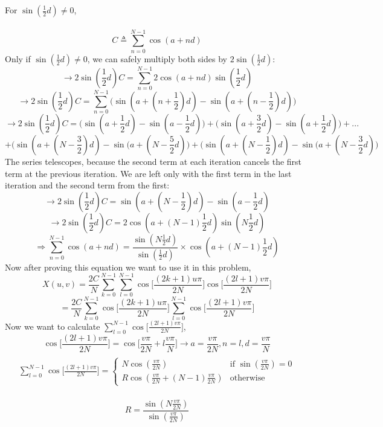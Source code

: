 \documentclass[fleqn]{article}
\begin{document}
\begin{question}
{For $\sin(\frac{1}{2}d) \neq 0$,\\~\\
\[C \triangleq \sum_{n=0}^{N-1}\cos(a + nd)\]
Only if $\sin(\frac{1}{2}d) \neq 0$, we can safely multiply both sides by $2\sin(\frac{1}{2}d)$:
\[\rightarrow  2 \sin(\frac{1}{2} d) C = \sum_{n=0}^{N-1}2 \cos(a + nd) \sin(\frac{1}{2}d) \]
\[\rightarrow 2 \sin(\frac{1}{2} d) C =\sum_{n=0}^{N-1} \bigg ( \sin(a + (n + \frac{1}{2}) d) - \sin(a + (n -\frac{1}{2}) d) \bigg )\]
\[\rightarrow 2 \sin(\frac{1}{2} d) C = \bigg ( \sin(a + \frac{1}{2}d) - \sin(a - \frac{1}{2}d) \bigg )+\bigg ( \sin(a + \frac{3}{2}d) - \sin(a + \frac{1}{2}d) \bigg ) + ... \]
\[+\bigg ( \sin(a + (N - \frac{3}{2}) d) - \sin(a + (N - \frac{5}{2} d) \bigg ) +\bigg ( \sin(a + (N - \frac{1}{2}) d) - \sin(a + (N - \frac{3}{2} d) \bigg )\]
The series telescopes, because the second term at each iteration cancels the first term at the previous iteration. We are left only with the first term in the last iteration and the second term from the first:
\[\rightarrow 2 \sin(\frac{1}{2} d) C =\sin(a + (N - \frac{1}{2}) d) - \sin(a - \frac{1}{2} d)\]
\[\rightarrow  2 \sin(\frac{1}{2} d) C =2 \cos( a + (N - 1) \frac{1}{2} d ) \sin( N \frac{1}{2} d )\]
\[\Rightarrow \boxed{\sum_{n=0}^{N-1} \cos(a + nd) = \frac{\sin(N \frac{1}{2}d)}{\sin(\frac{1}{2} d)}\times \cos ( a + (N - 1) \frac{1}{2} d) }\]
Now after proving this equation we want to use it in this problem,
\[X(u,v)=  \frac{2C}{N}\sum_{k=0}^{N-1}\sum_{l=0}^{N-1} \cos\big[\frac{(2k+1)u\pi}{2N} \big]\cos\big[\frac{(2l+1)v\pi}{2N} \big] \]
\[= \frac{2C}{N}\sum_{k=0}^{N-1} \cos\big[\frac{(2k+1)u\pi}{2N}\big]\sum_{l=0}^{N-1} \cos\big[\frac{(2l+1)v\pi}{2N} \big] \]
Now we want to calculate $ \sum_{l=0}^{N-1} \cos\big[\frac{(2l+1)v\pi}{2N} \big]$,\\
\[ \cos\big[\frac{(2l+1)v\pi}{2N} \big] = \cos\big[\frac{v\pi}{2N}+l\frac{v\pi}{N}  \big] \rightarrow \boxed{a=\frac{v\pi}{2N}}, \boxed{n=l} , \boxed{d=\frac{v\pi}{N}} \]
\[\begin{split} \\
	\sum_{l=0}^{N-1}\cos\big[\frac{(2l+1)v\pi}{2N} \big] =
	\begin{cases}
	N \cos \left( \frac{v\pi}{2N} \right) & \text{if } \sin\left(\frac{v\pi}{2N}\right) = 0 \\
	R \cos ( \frac{v\pi}{2N} + (N - 1) \frac{v\pi}{2N}) & \text{otherwise}
	\end{cases}
\end{split}\]\\
\[R = \frac{\sin(N  \frac{v\pi}{2N})}{\sin( \frac{v\pi}{2N})}\]
}
\end{question}
\end{document}
